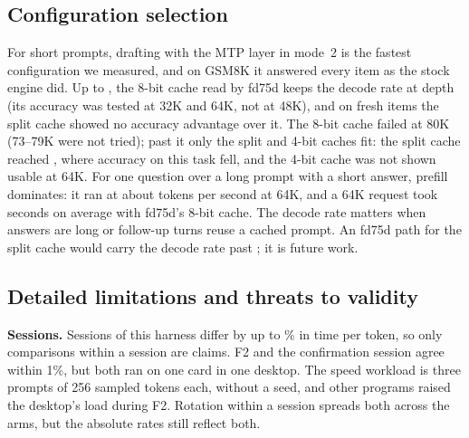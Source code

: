 \documentclass[11pt,letterpaper]{article}
\begin{document}
\subsection{Configuration selection}
\label{sec:choice}
For short prompts, drafting with the MTP layer in mode~2 is the fastest
configuration we measured, and on GSM8K it answered every item as the stock
engine did. Up to \PeReachEE, the 8-bit cache read by fd75d keeps the decode
rate at depth (its accuracy was tested at 32K and 64K, not at 48K), and on
fresh items the split cache showed no accuracy advantage over it. The 8-bit cache failed at 80K (73--79K were not tried); past it
only the split and 4-bit caches fit: the split cache
reached \PeReachEF, where accuracy on this task fell, and the 4-bit cache was
not shown usable at 64K. For one question over a long prompt with a short
answer, prefill dominates: it ran at about \PeArmEESixtyFourPrefill{} tokens
per second at 64K, and a 64K request took \PeArmEESixtyFourItemS{} seconds on
average with fd75d's 8-bit cache. The decode rate matters when answers are
long or follow-up turns reuse a cached prompt. An fd75d path for the split
cache would carry the decode rate past \PeReachEE; it is future work.

\subsection{Detailed limitations and threats to validity}
\label{sec:limitations}
\textbf{Sessions.} Sessions of this harness differ by up to
\PeAuditSlowHi\% in time per token, so only comparisons within a session are
claims. F2 and the confirmation session agree within 1\%, but both ran on one
card in one desktop. The speed workload is three prompts of 256 sampled
tokens each, without a seed, and other programs raised the desktop's load
during F2. Rotation within a session spreads both across the arms, but the
absolute rates still reflect both.
\end{document}
